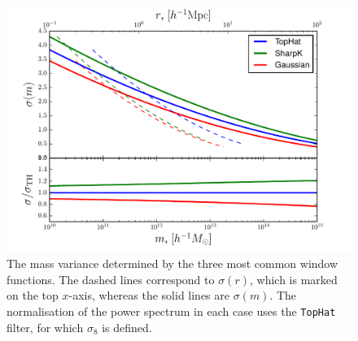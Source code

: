 \documentclass[5p]{elsarticle}
\begin{document}
\begin{figure}
  \centering
  \includegraphics[width=\linewidth]{figures/filter_sigma.pdf}
  \caption[Mass variance using three different filters]{The mass variance determined by the three most common window functions. The dashed lines correspond to $\sigma(r)$, which is marked on the top $x$-axis, whereas the solid lines are $\sigma(m)$. The normalisation of the power spectrum in each case uses the \texttt{TopHat} filter, for which $\sigma_8$ is defined.}
  \label{fig:filter_sigma}
\end{figure}


\end{document}
